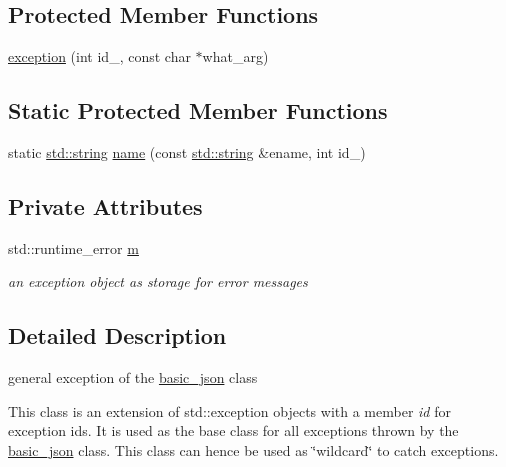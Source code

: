 \subsection*{Protected Member Functions}
\begin{DoxyCompactItemize}
\item 
\mbox{\hyperlink{classnlohmann_1_1detail_1_1exception_ae323ad0d53bc724414c2233164e65657}{exception}} (int id\+\_\+, const char $\ast$what\+\_\+arg)
\end{DoxyCompactItemize}
\subsection*{Static Protected Member Functions}
\begin{DoxyCompactItemize}
\item 
static \mbox{\hyperlink{namespacenlohmann_1_1detail_a1ed8fc6239da25abcaf681d30ace4985ab45cffe084dd3d20d928bee85e7b0f21}{std\+::string}} \mbox{\hyperlink{classnlohmann_1_1detail_1_1exception_abf41a7e9178356314082284e6cfea278}{name}} (const \mbox{\hyperlink{namespacenlohmann_1_1detail_a1ed8fc6239da25abcaf681d30ace4985ab45cffe084dd3d20d928bee85e7b0f21}{std\+::string}} \&ename, int id\+\_\+)
\end{DoxyCompactItemize}
\subsection*{Private Attributes}
\begin{DoxyCompactItemize}
\item 
std\+::runtime\+\_\+error \mbox{\hyperlink{classnlohmann_1_1detail_1_1exception_ad54778dc4f125488cbce8ec276dfdde2}{m}}
\begin{DoxyCompactList}\small\item\em an exception object as storage for error messages \end{DoxyCompactList}\end{DoxyCompactItemize}


\subsection{Detailed Description}
general exception of the \mbox{\hyperlink{classnlohmann_1_1basic__json}{basic\+\_\+json}} class 

This class is an extension of {\ttfamily std\+::exception} objects with a member {\itshape id} for exception ids. It is used as the base class for all exceptions thrown by the \mbox{\hyperlink{classnlohmann_1_1basic__json}{basic\+\_\+json}} class. This class can hence be used as \char`\"{}wildcard\char`\"{} to catch exceptions.

